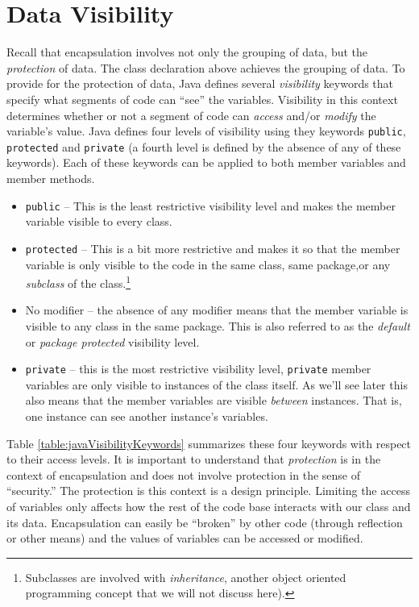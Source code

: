 \section{Data Visibility}

Recall that encapsulation involves not only the grouping of data, but
the \emph{protection} of data.  The class declaration above achieves
the grouping of data.  To provide for the protection of data, Java
defines several \emph{visibility} keywords that specify what segments
of code can ``see'' the variables.  Visibility in this context determines
whether or not a segment of code can \emph{access} and/or \emph{modify}
the variable's value.  Java defines four levels of visibility using
they keywords \texttt{public}, \texttt{protected}
and \texttt{private} (a fourth level is defined by the
absence of any of these keywords).  Each of these keywords can
be applied to both member variables and member methods.

\begin{itemize}
  \item \texttt{public} -- This is the least restrictive 
    visibility level and makes the member variable visible to every
    class.
  \item \texttt{protected} -- This is a bit more restrictive
    and makes it so that the member variable is only visible to the
    code in the same class, same package,or any \emph{subclass} of the 
    class.\footnote{Subclasses are involved with \emph{inheritance}, 
    another object oriented programming concept that we will not
    discuss here).}
  \item No modifier -- the absence of any modifier means that the member
    variable is visible to any class in the same package.  This is also
  referred to as the \emph{default} or \emph{package protected} 
  visibility level.
  \item \texttt{private} -- this is the most restrictive 
    visibility level, \texttt{private} member variables are
    only visible to instances of the class itself.  As we'll see later
    this also means that the member variables are visible \emph{between}
    instances.  That is, one instance can see another instance's variables.
\end{itemize}

Table \ref{table:javaVisibilityKeywords} summarizes these four keywords
with respect to their access levels.  It is important to understand that
\emph{protection} is in the context of encapsulation and does not involve
protection in the sense of ``security.''  The protection is this context
is a design principle.  Limiting the access of variables only affects 
how the rest of the code base interacts with our class and its data.  
Encapsulation can easily be ``broken'' by other code (through reflection
or other means) and the values of variables can be accessed or modified.

